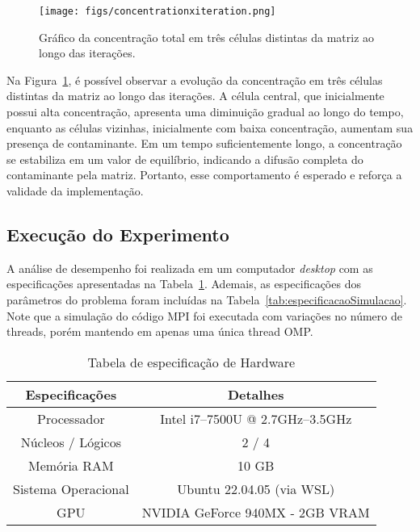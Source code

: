 \documentclass[12pt]{article}
\begin{document}
\begin{figure}[htb]
  \centering
  \texttt{[image: figs/concentrationxiteration.png]}
  \caption{Gráfico da concentração total em três células distintas da matriz ao longo das iterações.}\label{fig:concentracaoXiteracao}
\end{figure}

Na Figura~\ref{fig:concentracaoXiteracao}, é possível observar a evolução da
concentração em três células distintas da matriz ao longo das iterações. A
célula central, que inicialmente possui alta concentração, apresenta uma
diminuição gradual ao longo do tempo, enquanto as células vizinhas,
inicialmente com baixa concentração, aumentam sua presença de contaminante. Em
um tempo suficientemente longo, a concentração se estabiliza em um valor de
equilíbrio, indicando a difusão completa do contaminante pela matriz. Portanto,
esse comportamento é esperado e reforça a validade da implementação.

\subsection{Execução do Experimento}

A análise de desempenho foi realizada em um computador \textit{desktop} com as
especificações apresentadas na Tabela~\ref{tab:especificacaoHardware}. Ademais,
as especificações dos parâmetros do problema foram incluídas na
Tabela~\ref{tab:especificacaoSimulacao}. Note que a simulação do código MPI foi
executada com variações no número de threads, porém mantendo em apenas uma
única thread OMP.

\begin{table}[htb]
  \centering
  \caption{Tabela de especificação de Hardware}
  \vspace{0.3cm}
  \begin{tabular}{||c c||}
    \hline
    Especificações      & Detalhes                         \\ [0.5ex]
    \hline\hline
    Processador         & Intel i7--7500U @ 2.7GHz--3.5GHz \\
    \hline
    Núcleos / Lógicos   & 2 / 4                            \\
    \hline
    Memória RAM         & 10 GB                            \\
    \hline
    Sistema Operacional & Ubuntu 22.04.05 (via WSL)        \\
    \hline
    GPU                 & NVIDIA GeForce 940MX - 2GB VRAM  \\
    \hline
  \end{tabular}\label{tab:especificacaoHardware}
\end{table}
\end{document}
